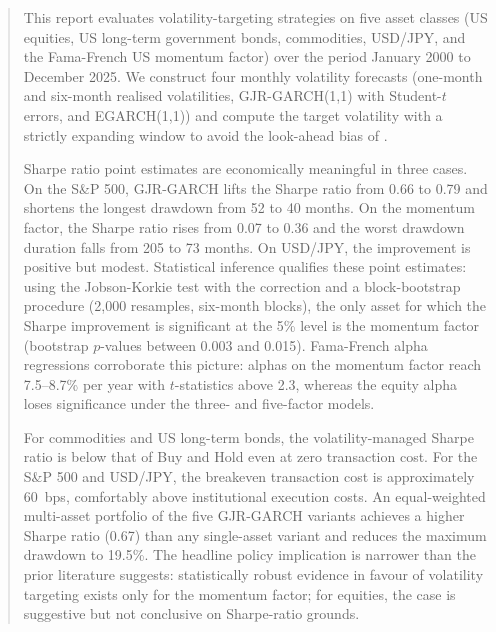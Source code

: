 \documentclass[12pt, a4paper]{article}
\begin{document}
\begin{abstract}
\noindent
This report evaluates volatility-targeting strategies on five asset classes (US equities,
US long-term government bonds, commodities, USD/JPY, and the Fama-French US momentum
factor) over the period January 2000 to December 2025. We construct four monthly volatility
forecasts (one-month and six-month realised volatilities, GJR-GARCH(1,1) with Student-$t$
errors, and EGARCH(1,1)) and compute the target volatility with a strictly expanding window
to avoid the look-ahead bias of \citet{moreira2017}.

Sharpe ratio point estimates are economically meaningful in three cases. On the S\&P 500,
GJR-GARCH lifts the Sharpe ratio from 0.66 to 0.79 and shortens the longest drawdown from
52 to 40 months. On the momentum factor, the Sharpe ratio rises from 0.07 to 0.36 and the
worst drawdown duration falls from 205 to 73 months. On USD/JPY, the improvement is
positive but modest. Statistical inference qualifies these point estimates: using the
Jobson-Korkie test with the \citet{memmel2003} correction and a block-bootstrap procedure
(2{,}000 resamples, six-month blocks), the only asset for which the Sharpe improvement is
significant at the 5\% level is the momentum factor (bootstrap $p$-values between 0.003
and 0.015). Fama-French alpha regressions corroborate this picture: alphas on the momentum
factor reach 7.5--8.7\% per year with $t$-statistics above 2.3, whereas the equity alpha
loses significance under the three- and five-factor models.

For commodities and US long-term bonds, the volatility-managed Sharpe ratio is below
that of Buy and Hold even at zero transaction cost. For the S\&P 500 and USD/JPY, the
breakeven transaction cost is approximately 60~bps, comfortably above institutional execution
costs. An equal-weighted multi-asset portfolio of the five GJR-GARCH variants achieves a
higher Sharpe ratio (0.67) than any single-asset variant and reduces the maximum drawdown
to 19.5\%. The headline policy implication is narrower than the prior literature suggests:
statistically robust evidence in favour of volatility targeting exists only for the momentum
factor; for equities, the case is suggestive but not conclusive on Sharpe-ratio grounds.
\end{abstract}

\tableofcontents
\newpage

\end{document}
